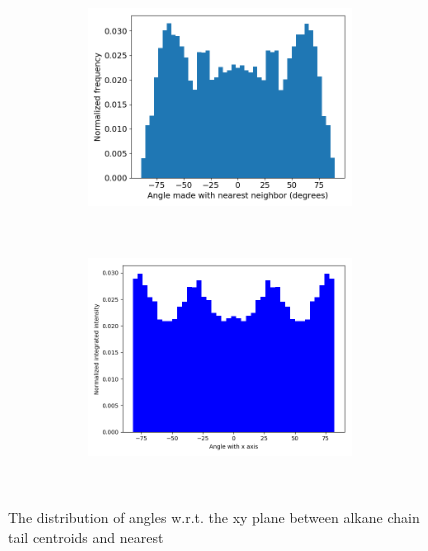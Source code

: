 \documentclass{article}
\begin{document}
\begin{figure}
	\begin{subfigure}{\linewidth}
	\centering
		\begin{subfigure}{0.45\textwidth}
	        \centering
		        \includegraphics[width=\linewidth]{angles_traj_layered.png}
		        \caption{}~\label{fig:rz_layered}
		\end{subfigure}
		\begin{subfigure}{0.45\textwidth}
        	\centering
		        \includegraphics[width=\linewidth]{layered_angle_v_I.png}
		        \caption{}~\label{fig:layered_integration}
		\end{subfigure}
	\end{subfigure}
  \caption{The distribution of angles w.r.t. the xy plane between alkane chain tail centroids and nearest
}
\end{figure}
\end{document}
